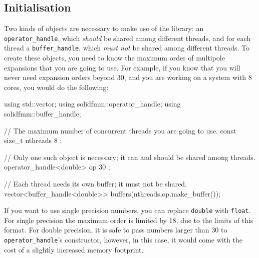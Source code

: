 \documentclass{scrbook}
\begin{document}
\subsection{Initialisation}\label{sec:quickinit}
Two kinds of objects are necessary to make use of the library: an 
\lstinline|operator_handle|, which \emph{should} be shared among different
threads, and for each thread a \lstinline|buffer_handle|, which \emph{must not}
be shared among  different threads. To create these objects, you need to know
the maximum order of multipole expansions that you are going to use. For
example, if you know that you will never need expansion orders beyond 30, and
you are working on a system with 8 cores, you would do the following:
\begin{cppcode*}
using std::vector;
using solidfmm::operator_handle;
using solidfmm::buffer_handle;

// The maximum number of concurrent threads you are going to use.
const size_t nthreads { 8 };

// Only one such object is necessary; it can and should be shared among threads.
operator_handle<double> op  { 30 }; 
                                     
// Each thread needs its own buffer; it must not be shared.
vector<buffer_handle<double>> buffers(nthreads,op.make_buffer());
\end{cppcode*}
If you want to use single precision numbers, you can replace 
\lstinline[style=cpp]|double| with \lstinline[style=cpp]|float|. For single
precision the maximum order is limited by 18, due to the limits of this
format. For double precision, it is safe to pass numbers larger than 30 to
\lstinline|operator_handle|'s constructor, however, in this case, it would come
with the cost of a slightly increased memory footprint.
\end{document}
